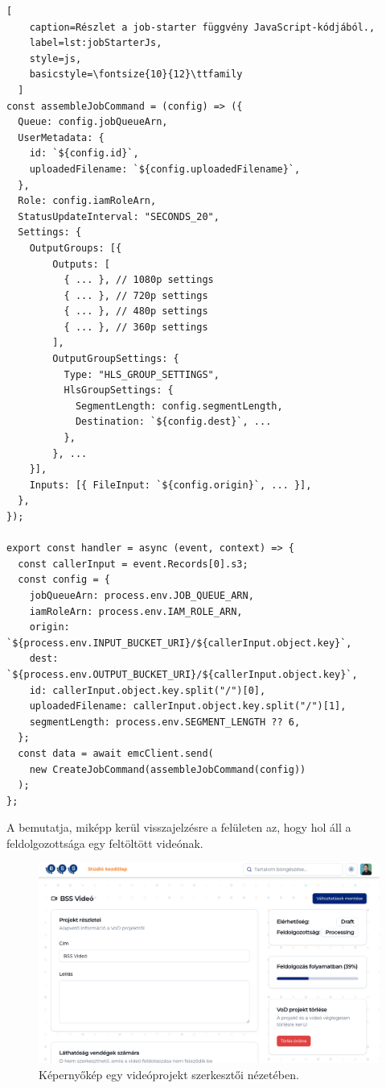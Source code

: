 \begin{minipage}{0.92\textwidth}
  \begin{lstlisting}[
    caption=Részlet a job-starter függvény JavaScript-kódjából.,
    label=lst:jobStarterJs,
    style=js,
    basicstyle=\fontsize{10}{12}\ttfamily
  ]
const assembleJobCommand = (config) => ({
  Queue: config.jobQueueArn,
  UserMetadata: {
    id: `${config.id}`,
    uploadedFilename: `${config.uploadedFilename}`,
  },
  Role: config.iamRoleArn,
  StatusUpdateInterval: "SECONDS_20",
  Settings: {
    OutputGroups: [{
        Outputs: [
          { ... }, // 1080p settings
          { ... }, // 720p settings
          { ... }, // 480p settings
          { ... }, // 360p settings
        ],
        OutputGroupSettings: {
          Type: "HLS_GROUP_SETTINGS",
          HlsGroupSettings: {
            SegmentLength: config.segmentLength, 
            Destination: `${config.dest}`, ...
          },
        }, ...
    }],
    Inputs: [{ FileInput: `${config.origin}`, ... }],
  },
});

export const handler = async (event, context) => {
  const callerInput = event.Records[0].s3;
  const config = {
    jobQueueArn: process.env.JOB_QUEUE_ARN,
    iamRoleArn: process.env.IAM_ROLE_ARN,
    origin: `${process.env.INPUT_BUCKET_URI}/${callerInput.object.key}`,
    dest: `${process.env.OUTPUT_BUCKET_URI}/${callerInput.object.key}`,
    id: callerInput.object.key.split("/")[0],
    uploadedFilename: callerInput.object.key.split("/")[1],
    segmentLength: process.env.SEGMENT_LENGTH ?? 6,
  };
  const data = await emcClient.send(
    new CreateJobCommand(assembleJobCommand(config))
  );
};
\end{lstlisting}
\end{minipage}

A  bemutatja, miképp kerül visszajelzésre a felületen az, hogy hol áll a feldolgozottsága egy feltöltött videónak. 

\begin{figure}[ht]
  \centering
  \includegraphics[width=150mm, keepaspectratio]{figures/processing.png}
  \caption{Képernyőkép egy videóprojekt szerkesztői nézetében.}
  \label{fig:processing}
\end{figure}

